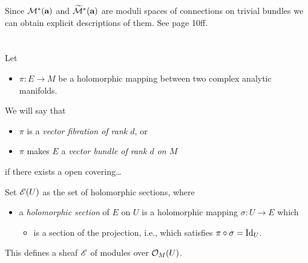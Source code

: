 Since $\mathcal{M}^*(\textbf{a})$ and $\widetilde{\mathcal{M}}^*(\textbf{a})$ are moduli spaces
of connections on trivial bundles we can obtain explicit descriptions of them.
See \cite{thboalch} page 10ff.

\section{\cite{sabbah2007isomonodromic}} %
\begin{defn}
  Let
  \begin{itemize}
    \item $\pi:E\to M$ be a holomorphic mapping between two complex analytic
      manifolds.
  \end{itemize}
  We will say that
  \begin{itemize}
    \item $\pi$ is a \emph{vector fibration of rank $d$}, or
    \item $\pi$ makes $E$ a \emph{vector bundle of rank $d$ on $M$}
  \end{itemize}
  if there exists a open covering\dots
\end{defn}
Set $\mathscr{E}(U)$ as the set of holomorphic sections, where
\begin{itemize}
  \item a \emph{holomorphic section} of $E$ on $U$ is a holomorphic mapping
    $\sigma:U\to E$ which
    \begin{itemize}
      \item is a section of the projection, i.e., which satisfies
        $\pi\circ\sigma=\operatorname{Id}_U$.
    \end{itemize}
\end{itemize}
This defines a sheaf $\mathscr{E}$ of modules over $\mathcal{O}_M(U)$.
